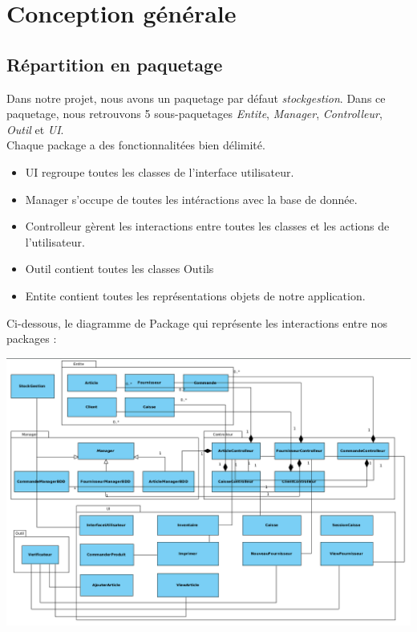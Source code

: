 \chapter{Conception générale}

\section{Répartition en paquetage}

Dans notre projet, nous avons un paquetage par défaut \textit{stockgestion}. Dans ce paquetage, nous retrouvons 5 sous-paquetages \textit{Entite}, \textit{Manager}, \textit{Controlleur}, \textit{Outil} et \textit{UI}.\\

Chaque package a des fonctionnalitées bien délimité. 
\begin{itemize}
	\item UI regroupe toutes les classes de l'interface utilisateur.
	\item Manager s'occupe de toutes les intéractions avec la base de donnée.
	\item Controlleur gèrent les interactions entre toutes les classes et les actions de l'utilisateur.
	\item Outil contient toutes les classes Outils
	\item Entite contient toutes les représentations objets de notre application.
\end{itemize}

Ci-dessous, le diagramme de Package qui représente les interactions entre nos packages :
\begin{center}
	\includegraphics[width=14cm]{Conception/DiagrammeDeClassePackage.png}
\end{center}

